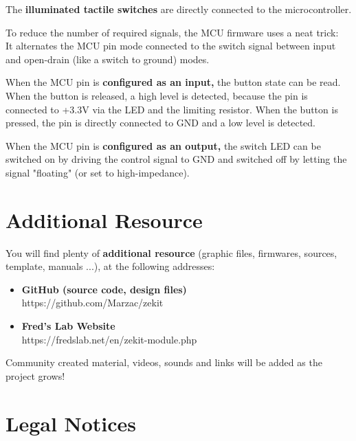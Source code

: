 \documentclass{scrartcl}
\begin{document}
The \textbf{illuminated tactile switches} are directly connected to the microcontroller.

To reduce the number of required signals, the MCU firmware uses a neat trick: \\
It alternates the MCU pin mode connected to the switch signal between input and open-drain (like a switch to ground) modes.

When the MCU pin is \textbf{configured as an input,} the button state can be read.
When the button is released, a high level is detected, because the pin is connected to +3.3V via the LED and the limiting resistor.
When the button is pressed, the pin is directly connected to GND and a low level is detected.

When the MCU pin is \textbf{configured as an output,} the switch LED can be switched on by driving the control signal to GND and switched off by letting the signal "floating" (or set to high-impedance).

\pagebreak
\section{Additional Resource}
You will find plenty of \textbf{additional resource} (graphic files, firmwares, sources, template, manuals ...), at the following addresses:

\vspace{0.25cm}
\begin{itemize}
    \item \textbf{GitHub (source code, design files)} \\
          https://github.com/Marzac/zekit
          \vspace{0.25cm}
    \item \textbf{Fred's Lab Website} \\
          https://fredslab.net/en/zekit-module.php
\end{itemize}

\vspace{0.25cm}
Community created material, videos, sounds and links will be added as the project grows!


\section{Legal Notices}
\end{document}
